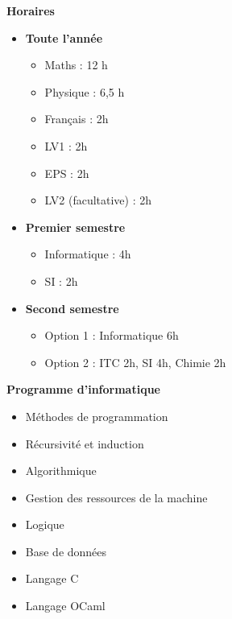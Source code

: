 \documentclass[10pt]{beamer}
\begin{document}
\begin{frame}{\Ctitle}
    \begin{center}
        \textcolor{BrickRed}{\textbf{\large Horaires}}
    \end{center}
    \begin{itemize}
        \item<1-> \textbf{Toute l'année}
        \begin{itemize}
            \item<2-> Maths : 12 h
            \item<3-> Physique : 6,5 h
            \item<4-> Français : 2h
            \item<5-> LV1 : 2h
            \item<6-> EPS : 2h
            \item<6-> LV2 (facultative) : 2h
        \end{itemize}
        \item<7-> \textbf{Premier semestre}
        \begin{itemize}
            \item<8-> Informatique : 4h
            \item<9-> SI : 2h
        \end{itemize}
        \item<10-> \textbf{Second semestre}
        \begin{itemize}
        \item<11-> Option 1 : Informatique  6h
        \item<12-> Option 2 : ITC  2h, SI 4h, Chimie 2h  
        \end{itemize}
    \end{itemize}
\end{frame}

\begin{frame}{\Ctitle}
    \begin{center}
        \textcolor{BrickRed}{\textbf{\large Programme d'informatique}}
    \end{center}
    \begin{itemize}
        \item<1-> Méthodes de programmation
        \item<2-> Récursivité et induction
        \item<3-> Algorithmique
        \item<4-> Gestion des ressources de la machine
        \item<5-> Logique
        \item<6-> Base de données
        \item<7-> Langage C
        \item<8-> Langage OCaml 
    \end{itemize}
\end{frame}
\end{document}
